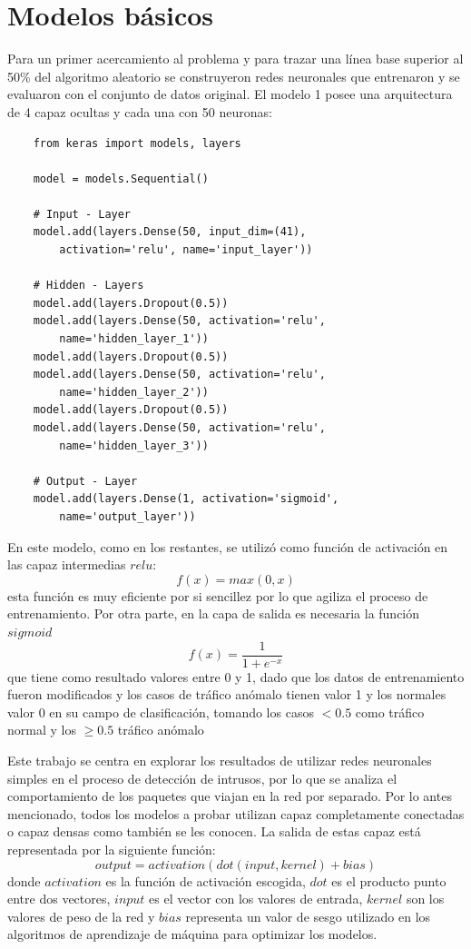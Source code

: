 \section{Modelos básicos}
Para un primer acercamiento al problema y para trazar una línea base superior al 50\% del algoritmo aleatorio se construyeron redes neuronales que entrenaron y se evaluaron con el conjunto de datos original. El modelo 1 posee una arquitectura de 4 capaz ocultas y cada una con 50 neuronas:
\begin{verbatim}
    from keras import models, layers

    model = models.Sequential()

    # Input - Layer
    model.add(layers.Dense(50, input_dim=(41), 
        activation='relu', name='input_layer'))

    # Hidden - Layers
    model.add(layers.Dropout(0.5))
    model.add(layers.Dense(50, activation='relu', 
        name='hidden_layer_1'))
    model.add(layers.Dropout(0.5))
    model.add(layers.Dense(50, activation='relu', 
        name='hidden_layer_2'))
    model.add(layers.Dropout(0.5))
    model.add(layers.Dense(50, activation='relu', 
        name='hidden_layer_3'))

    # Output - Layer
    model.add(layers.Dense(1, activation='sigmoid', 
        name='output_layer'))
\end{verbatim}

En este modelo, como en los restantes, se utilizó como función de activación en las capaz intermedias $relu$:
\[f(x)=max(0,x)\]
esta función es muy eficiente por si sencillez por lo que agiliza el proceso de entrenamiento. Por otra parte, en la capa de salida es necesaria la función $sigmoid$
\[f(x) = \frac{1}{1 + e^{-x}}\]
que tiene como resultado valores entre 0 y 1, dado que los datos de entrenamiento fueron modificados y los casos de tráfico anómalo tienen valor 1 y los normales valor 0 en su campo de clasificación, tomando los casos $< 0.5$ como tráfico normal y los $\geq 0.5$ tráfico anómalo

Este trabajo se centra en explorar los resultados de utilizar redes neuronales simples en el proceso de detección de intrusos, por lo que se analiza el comportamiento de los paquetes que viajan en la red por separado. Por lo antes mencionado, todos los modelos a probar utilizan capaz completamente conectadas o capaz densas como también se les conocen. La salida de estas capaz está representada por la siguiente función:
\[output = activation(dot(input, kernel) + bias)\]
donde $activation$ es la función de activación escogida, $dot$ es el producto punto entre dos vectores, $input$ es el vector con los valores de entrada, $kernel$ son los valores de peso de la red y $bias$ representa un valor de sesgo utilizado en los algoritmos de aprendizaje de máquina para optimizar los modelos.

